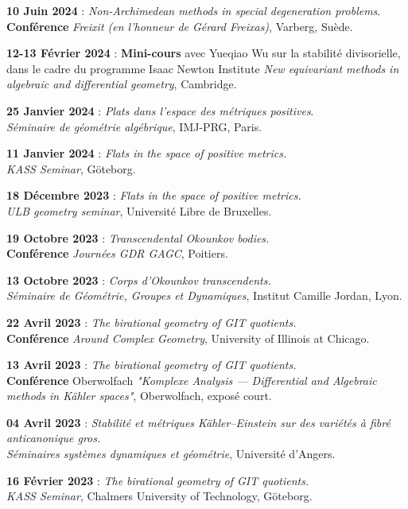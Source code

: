 \documentclass{article}
\theoremstyle{definition}
\theoremstyle{definition}
\theoremstyle{definition}
\newcommand\bsni{\bigskip\noindent}
\begin{document}
\bsni \textbf{10 Juin 2024} : \textit{Non-Archimedean methods in special degeneration problems}.\\
\textbf{Conférence} \textit{Freixit (en l'honneur de Gérard Freixas)}, Varberg, Suède.


\bsni \textbf{12-13 Février 2024} : \textbf{Mini-cours }avec Yueqiao Wu sur la stabilité divisorielle, dans le cadre du programme Isaac Newton Institute \textit{New equivariant methods in algebraic and differential geometry}, Cambridge.


\bsni \textbf{25 Janvier 2024} : \textit{Plats dans l'espace des métriques positives}.\\
\textit{Séminaire de géométrie algébrique}, IMJ-PRG, Paris.


\bsni \textbf{11 Janvier 2024} : \textit{Flats in the space of positive metrics.}\\
\textit{KASS Seminar}, Göteborg.


\bsni \textbf{18 Décembre 2023} : \textit{Flats in the space of positive metrics.}\\
\textit{ULB geometry seminar}, Université Libre de Bruxelles.


\bsni \textbf{19 Octobre 2023} : \textit{Transcendental Okounkov bodies.}\\
\textbf{Conférence} \textit{Journées GDR GAGC}, Poitiers.

\bsni \textbf{13 Octobre 2023} : \textit{Corps d'Okounkov transcendents.}\\
\textit{Séminaire de Géométrie, Groupes et Dynamiques}, Institut Camille Jordan, Lyon.

\bsni \textbf{22 Avril 2023} : \textit{The birational geometry of GIT quotients.}\\
\textbf{Conférence} \textit{Around Complex Geometry}, University of Illinois at Chicago.

\bsni \textbf{13 Avril 2023} : \textit{The birational geometry of GIT quotients.}\\
\textbf{Conférence} Oberwolfach \textit{"Komplexe Analysis — Differential and Algebraic methods in Kähler spaces"}, Oberwolfach, exposé court.


\bsni \textbf{04 Avril 2023} : \textit{Stabilité et métriques Kähler–Einstein sur des variétés à fibré anticanonique gros.}\\
\textit{Séminaires systèmes dynamiques et géométrie}, Université d'Angers.

\bsni \textbf{16 Février 2023} : \textit{The birational geometry of GIT quotients.}\\
\textit{KASS Seminar}, Chalmers University of Technology, Göteborg.
\end{document}
